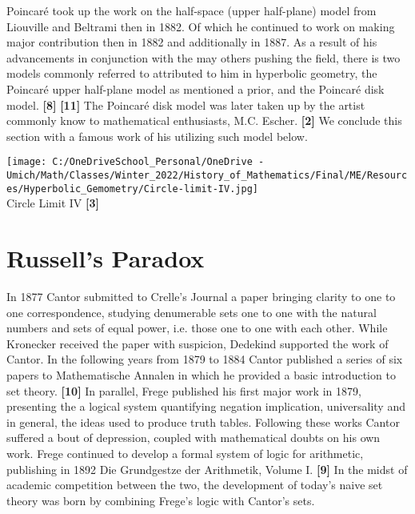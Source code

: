 \documentclass[12pt]{article}
\begin{document}
\hspace{5mm}
Poincaré took up the work on the half-space (upper half-plane) model from Liouville and Beltrami then in 1882. 
Of which he continued to work on making major contribution then in 1882 and additionally in 1887. 
As a result of his advancements in conjunction with the may others pushing the field, 
there is two models commonly referred to attributed to him in hyperbolic geometry, 
the Poincaré upper half-plane model as mentioned a prior, and the Poincaré disk model. \textbf{[8]} \textbf{[11]} 
The Poincaré disk model was later taken up by the artist commonly know to mathematical enthusiasts, M.C. Escher. \textbf{[2]} 
We conclude this section with a famous work of his utilizing such model below. 

\begin{center}
  \texttt{[image: C:/OneDriveSchool\_Personal/OneDrive - Umich/Math/Classes/Winter\_2022/History\_of\_Mathematics/Final/ME/Resources/Hyperbolic\_Gemometry/Circle-limit-IV.jpg]} \\
  Circle Limit IV \textbf{[3]} 
\end{center}

\section{Russell's Paradox}

\hspace{5mm}
In 1877 Cantor submitted to Crelle's Journal a paper bringing clarity to one to one correspondence, 
studying denumerable sets one to one with the natural numbers and sets of equal power, i.e. those one to one with each other. 
While Kronecker received the paper with suspicion, Dedekind supported the work of Cantor. 
In the following years from 1879 to 1884 Cantor published a series of six papers to Mathematische Annalen in which he provided a basic introduction to set theory. \textbf{[10]} 
In parallel, Frege published his first major work in 1879, presenting the a logical system quantifying negation implication, universality and in general, the ideas used to produce truth tables. 
Following these works Cantor suffered a bout of depression, coupled with mathematical doubts on his own work. 
Frege continued to develop a formal system of logic for arithmetic, publishing in 1892 Die Grundgestze der Arithmetik, Volume I. \textbf{[9]} 
In the midst of academic competition between the two, the development of today's naive set theory was born by combining Frege's logic with Cantor's sets. 
\end{document}
